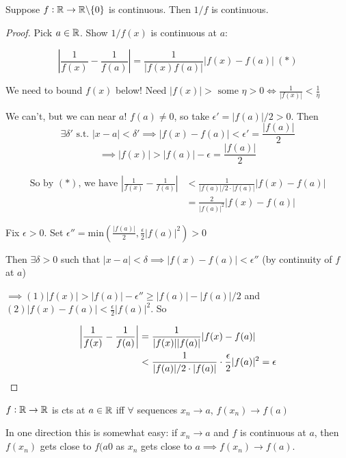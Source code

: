 \begin{example}
Suppose $f:\mathbb{R}\to \mathbb{R}\backslash\{0\}$ is continuous. Then $1/f$ is continuous. 

\begin{proof}
Pick $a\in\mathbb{R}$. Show $1/f(x)$ is continuous at $a$: 

\[\left|\frac{1}{f(x)} - \frac{1}{f(a)}\right|  = \frac{1}{|f(x)f(a)|}|f(x)-f(a)| ~(*)\]

We need to bound $f(x)$ below! Need $|f(x)| > \text{ some }\eta > 0 \iff \frac{1}{|f(x)|} < \frac{1}{\eta}$

We can't, but we can near $a$! $f(a) \neq 0$, so take $\epsilon' = |f(a)|/2 >0$. Then 
\[\exists \delta' \text{ s.t. } |x-a| < \delta' \implies|f(x) - f(a)| < \epsilon' = \frac{|f(a)|}{2}\]
\[\implies |f(x)| > |f(a)| -\epsilon = \frac{|f(a)|}{2}\]


\[\begin{aligned}
\text{So by } (*) \text{, we have }\left|\frac{1}{f(x)} - \frac{1}{f(a)}\right| &< \frac{1}{|f(a)|/2\cdot |f(a)|} |f(x) - f(a)| \\ 
	& = \frac{2}{|f(a)|^2}|f(x) - f(a)|
\end{aligned}
\]

Fix $\epsilon >0$. Set $\epsilon'' = \mathrm{min}\left(\frac{|f(a)|}{2}, \frac{\epsilon}{2}|f(a)|^2\right) > 0$

Then $\exists \delta > 0$ such that $|x-a| < \delta \implies |f(x) - f(a)| < \epsilon''$ (by continuity of $f$ at $a$)

$\implies (1) |f(x)| > |f(a)| - \epsilon'' \geq |f(a)| - |f(a)|/2$ and $(2) |f(x) - f(a)| < \frac{\epsilon}{2}|f(a)|^2$. So 

\[\begin{aligned}
\left|\frac{1}{f(x)} - \frac{1}{f(a)}\right| &= \frac{1}{|f(x)||f(a)|} |f(x) -f(a)| \\
&< \frac{1}{|f(a)|/2\cdot|f(a)|}\cdot \frac{\epsilon}{2}|f(a)|^2 = \epsilon	\qedhere
\end{aligned}
\]
\end{proof}	
\end{example}


\begin{theorem}
	$f: \mathbb{R} \to \mathbb{R}$ is cts at $a \in \mathbb{R}$ iff $\forall$ sequences $x_n \to a$, $f(x_n) \to f(a)$
\end{theorem}

In one direction this is somewhat easy: if $x_n \to a$ and $f$ is continuous at $a$, then $f(x_n)$ gets close to $f(a0$ as $x_n$ gets close to $a \implies f(x_n) \to f(a)$. 

